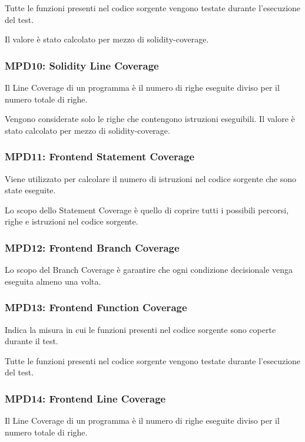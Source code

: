 Tutte le funzioni presenti nel codice sorgente vengono testate durante l'esecuzione del test.

Il valore è stato calcolato per mezzo di solidity-coverage.

\subsubsection{MPD10: Solidity Line Coverage}\label{sssec:solidity_line_coverage}
Il Line Coverage di un programma è il numero di righe eseguite diviso per il numero totale di righe.

Vengono considerate solo le righe che contengono istruzioni eseguibili.
Il valore è stato calcolato per mezzo di solidity-coverage.
\subsubsection{MPD11: Frontend Statement Coverage}\label{sssec:frontend_statement_coverage}
Viene utilizzato per calcolare il numero di istruzioni nel codice sorgente che sono state eseguite.

Lo scopo dello Statement Coverage è quello di coprire tutti i possibili percorsi, righe e istruzioni nel codice sorgente.

\subsubsection{MPD12: Frontend Branch Coverage}\label{sssec:frontend_branch_coverage}
Lo scopo del Branch Coverage è garantire che ogni condizione decisionale venga eseguita almeno una volta.

\subsubsection{MPD13: Frontend Function Coverage}\label{sssec:frontend_function_coverage}
Indica la misura in cui le funzioni presenti nel codice sorgente sono coperte durante il test.

Tutte le funzioni presenti nel codice sorgente vengono testate durante l'esecuzione del test.

\subsubsection{MPD14: Frontend Line Coverage}\label{sssec:frontend_line_coverage}
Il Line Coverage di un programma è il numero di righe eseguite diviso per il numero totale di righe.

